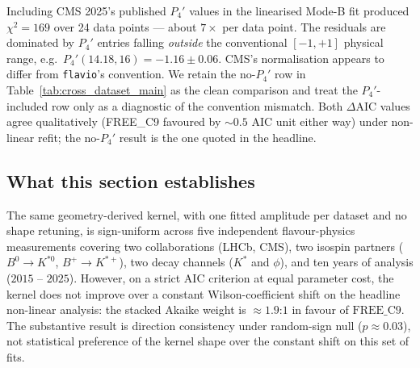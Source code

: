 Including CMS 2025's published $P_{4}'$ values in the linearised
Mode-B fit produced $\chi^{2}=169$ over 24 data points — about
$7\times$ per data point. The residuals are dominated by $P_{4}'$
entries falling \emph{outside} the conventional $[-1, +1]$ physical
range, e.g.\ $P_{4}'(14.18, 16) = -1.16 \pm 0.06$. CMS's normalisation
appears to differ from \texttt{flavio}'s convention. We retain
the no-$P_{4}'$ row in Table~\ref{tab:cross_dataset_main} as the clean
comparison and treat the $P_{4}'$-included row only as a diagnostic of
the convention mismatch. Both $\Delta\mathrm{AIC}$ values agree
qualitatively (FREE\_C9 favoured by $\sim 0.5$ AIC unit either way)
under non-linear refit; the no-$P_{4}'$ result is the one quoted in
the headline.

\subsection{What this section establishes}

The same geometry-derived kernel, with one fitted amplitude per
dataset and no shape retuning, is sign-uniform across five
independent flavour-physics measurements covering two collaborations
(LHCb, CMS), two isospin partners ($B^{0}\!\to\!K^{*0}$,
$B^{+}\!\to\!K^{*+}$), two decay channels ($K^{*}$ and $\phi$), and
ten years of analysis ($2015$ -- $2025$). However, on a strict
AIC criterion at equal parameter cost, the kernel does not improve
over a constant Wilson-coefficient shift on the headline non-linear
analysis: the stacked Akaike weight is $\approx 1.9$:$1$ in favour
of $\mathrm{FREE\_C9}$. The substantive result is direction
consistency under random-sign null
($p\approx 0.03$), not statistical preference of the kernel shape
over the constant shift on this set of fits.
